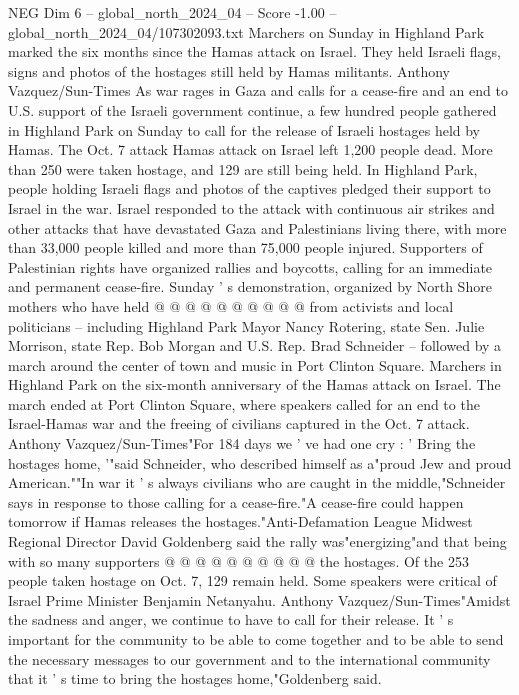 \begin{textsample}{NEG Dim 6 – global\_north\_2024\_04 – Score -1.00 – global\_north\_2024\_04/107302093.txt}  \label{ex:f6_neg_345}
Marchers on Sunday in Highland Park marked the six months since the Hamas attack on Israel.
They held Israeli flags, signs and photos of the hostages still held by Hamas militants.
Anthony Vazquez/Sun-Times As war rages in Gaza and calls for a cease-fire and an end to U.S. support of the Israeli government continue, a few hundred people gathered in Highland Park on Sunday to call for the release of Israeli hostages held by Hamas.
The Oct. 7 attack Hamas attack on Israel left 1,200 people dead.
More than 250 were taken hostage, and 129 are still being held.
In Highland Park, people holding Israeli flags and photos of the captives pledged their support to Israel in the war.
Israel responded to the attack with continuous air strikes and other attacks that have devastated Gaza and Palestinians living there, with more than 33,000 people killed and more than 75,000 people injured.
Supporters of Palestinian rights have organized rallies and boycotts, calling for an immediate and permanent cease-fire.
Sunday ' s demonstration, organized by North Shore mothers who have held @ @ @ @ @ @ @ @ @ @ from activists and local politicians -- including Highland Park Mayor Nancy Rotering, state Sen.
Julie Morrison, state Rep.
Bob Morgan and U.S.
Rep.
Brad Schneider -- followed by a march around the center of town and music in Port Clinton Square.
Marchers in Highland Park on the six-month anniversary of the Hamas attack on Israel.
The march ended at Port Clinton Square, where speakers called for an end to the Israel-Hamas war and the freeing of civilians captured in the Oct. 7 attack.
Anthony Vazquez/Sun-Times"For 184 days we ' ve had one cry : ' Bring the hostages home, '"said Schneider, who described himself as a"proud Jew and proud American.""In war it ' s always civilians who are caught in the middle,"Schneider says in response to those calling for a cease-fire."A cease-fire could happen tomorrow if Hamas releases the hostages."Anti-Defamation League Midwest Regional Director David Goldenberg said the rally was"energizing"and that being with so many supporters @ @ @ @ @ @ @ @ @ @ the hostages.
Of the 253 people taken hostage on Oct. 7, 129 remain held.
Some speakers were critical of Israel Prime Minister Benjamin Netanyahu.
Anthony Vazquez/Sun-Times"Amidst the sadness and anger, we continue to have to call for their release.
It ' s important for the community to be able to come together and to be able to send the necessary messages to our government and to the international community that it ' s time to bring the hostages home,"Goldenberg said.

\end{textsample}

